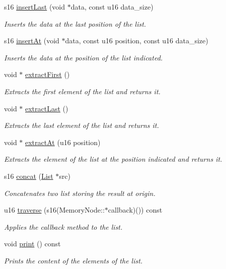 \begin{DoxyCompactItemize}
s16 \hyperlink{class_list_a14628aaa4a0681ea51e170c5badc998a}{insert\+Last} (void $\ast$data, const u16 data\+\_\+size)
\begin{DoxyCompactList}\small\item\em Inserts the data at the last position of the list. \end{DoxyCompactList}\item 
s16 \hyperlink{class_list_a8db6b9e09b72037ae6705ebdee8a96b0}{insert\+At} (void $\ast$data, const u16 position, const u16 data\+\_\+size)
\begin{DoxyCompactList}\small\item\em Inserts the data at the position of the list indicated. \end{DoxyCompactList}\item 
void $\ast$ \hyperlink{class_list_a6bd5b361c4a569a78fdeb5a78eacad03}{extract\+First} ()
\begin{DoxyCompactList}\small\item\em Extracts the first element of the list and returns it. \end{DoxyCompactList}\item 
void $\ast$ \hyperlink{class_list_ac9bda885e56890a73be49ed5f174fd93}{extract\+Last} ()
\begin{DoxyCompactList}\small\item\em Extracts the last element of the list and returns it. \end{DoxyCompactList}\item 
void $\ast$ \hyperlink{class_list_a4c2d0d80bf25e79e8ed070798e0f23be}{extract\+At} (u16 position)
\begin{DoxyCompactList}\small\item\em Extracts the element of the list at the position indicated and returns it. \end{DoxyCompactList}\item 
s16 \hyperlink{class_list_a31a2d683f5393b21d75c797a9cb22362}{concat} (\hyperlink{class_list}{List} $\ast$src)
\begin{DoxyCompactList}\small\item\em Concatenates two list storing the result at origin. \end{DoxyCompactList}\item 
u16 \hyperlink{class_list_ab727281af2fea05581f8f80a0a28d0f9}{traverse} (s16(Memory\+Node\+::$\ast$callback)()) const
\begin{DoxyCompactList}\small\item\em Applies the callback method to the list. \end{DoxyCompactList}\item 
void \hyperlink{class_list_af89a9b66f6d9da97918937c70bbb03d0}{print} () const
\begin{DoxyCompactList}\small\item\em Prints the content of the elements of the list. \end{DoxyCompactList}\end{DoxyCompactItemize}


